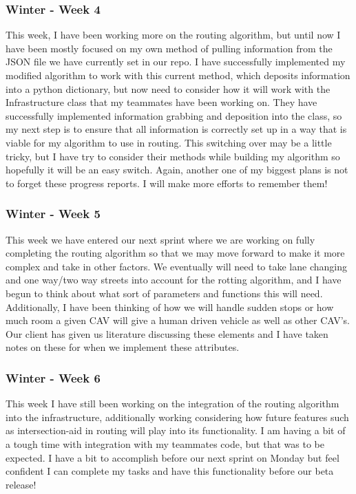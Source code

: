 \documentclass[onecolumn, draftclsnofoot,10pt, compsoc]{IEEEtran}
\begin{document}
\subsubsection{Winter - Week 4}
This week, I have been working more on the routing algorithm, but until now I have been mostly focused on my own method of pulling information from the JSON file we have currently set in our repo.
I have successfully implemented my modified algorithm to work with this current method, which deposits information into a python dictionary, but now need to consider how it will work with the Infrastructure class that my teammates have been working on.
They have successfully implemented information grabbing and deposition into the class, so my next step is to ensure that all information is correctly set up in a way that is viable for my algorithm to use in routing.
This switching over may be a little tricky, but I have try to consider their methods while building my algorithm so hopefully it will be an easy switch.
Again, another one of my biggest plans is not to forget these progress reports.
I will make more efforts to remember them!
\subsubsection{Winter - Week 5}
This week we have entered our next sprint where we are working on fully completing the routing algorithm so that we may move forward to make it more complex and take in other factors.
We eventually will need to take lane changing and one way/two way streets into account for the rotting algorithm, and I have begun to think about what sort of parameters and functions this will need.
Additionally, I have been thinking of how we will handle sudden stops or how much room a given CAV will give a human driven vehicle as well as other CAV’s.
Our client has given us literature discussing these elements and I have taken notes on these for when we implement these attributes.
\subsubsection{Winter - Week 6}
This week I have still been working on the integration of the routing algorithm into the infrastructure, additionally working considering how future features such as intersection-aid in routing will play into its functionality.
I am having a bit of a tough time with integration with my teammates code, but that was to be expected.
I have a bit to accomplish before our next sprint on Monday but feel confident I can complete my tasks and have this functionality before our beta release!
\end{document}
